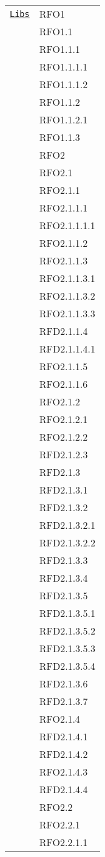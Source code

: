 \begin{longtable}{|>{\centering}m{10cm}|m{3cm}<{\centering}|}
\hyperref[Libs]{\texttt{Libs}} & RFO1\\
& RFO1.1\\
& RFO1.1.1\\
& RFO1.1.1.1\\
& RFO1.1.1.2\\
& RFO1.1.2\\
& RFO1.1.2.1\\
& RFO1.1.3\\
& RFO2\\
& RFO2.1\\
& RFO2.1.1\\
& RFO2.1.1.1\\
& RFO2.1.1.1.1\\
& RFO2.1.1.2\\
& RFO2.1.1.3\\
& RFO2.1.1.3.1\\
& RFO2.1.1.3.2\\
& RFO2.1.1.3.3\\
& RFD2.1.1.4\\
& RFD2.1.1.4.1\\
& RFO2.1.1.5\\
& RFO2.1.1.6\\
& RFO2.1.2\\
& RFO2.1.2.1\\
& RFO2.1.2.2\\
& RFD2.1.2.3\\
& RFD2.1.3\\
& RFD2.1.3.1\\
& RFD2.1.3.2\\
& RFD2.1.3.2.1\\
& RFD2.1.3.2.2\\
& RFD2.1.3.3\\
& RFD2.1.3.4\\
& RFD2.1.3.5\\
& RFD2.1.3.5.1\\
& RFD2.1.3.5.2\\
& RFD2.1.3.5.3\\
& RFD2.1.3.5.4\\
& RFD2.1.3.6\\
& RFD2.1.3.7\\
& RFO2.1.4\\
& RFD2.1.4.1\\
& RFD2.1.4.2\\
& RFO2.1.4.3\\
& RFD2.1.4.4\\
& RFO2.2\\
& RFO2.2.1\\
& RFO2.2.1.1\\

\end{longtable}
